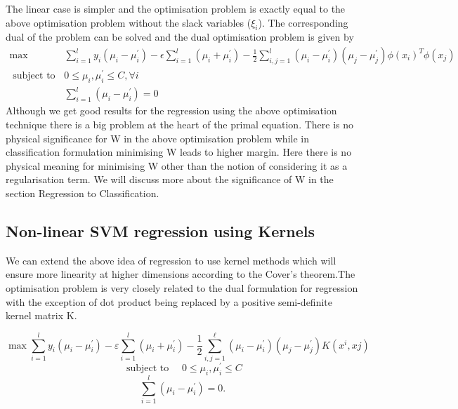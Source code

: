 \documentclass[../main.tex]{subfiles}
\begin{document}
The linear case is simpler and the optimisation problem is exactly equal to the above optimisation problem without the slack variables ($ \xi_{i}$). The corresponding dual of the problem can be solved and the dual optimisation problem is given by 
$$
\begin{aligned}
\max & \sum_{i=1}^{l} y_{i}\left(\mu_{i}-\mu_{i}^{\prime}\right)-\epsilon \sum_{i=1}^{l}\left(\mu_{i}+\mu_{i}^{\prime}\right)-\frac{1}{2} \sum_{i, j=1}^{l}\left(\mu_{i}-\mu_{i}^{\prime}\right)\left(\mu_{j}-\mu_{j}^{\prime}\right) \phi\left(x_{i}\right)^{T} \phi\left(x_{j}\right) \\
\text { subject to } \quad & 0 \leq \mu_{i}, \mu_{i}^{\prime} \leq C, \forall i \\
& \sum_{i=1}^{l}\left(\mu_{i}-\mu_{i}^{\prime}\right)=0
\end{aligned}
$$
Although we get good results for the regression using the above optimisation technique there is a big problem at the heart of the primal equation. There is no physical significance for W in the above optimisation problem while in classification formulation minimising W leads to higher margin. Here there is no physical meaning for minimising W other than the notion of considering it as a regularisation term. We will discuss more about the significance of W in the section Regression to Classification.

\subsection{Non-linear SVM regression using Kernels}
We can extend the above idea of regression to use kernel methods which will ensure more linearity at higher dimensions according to the Cover's theorem.The optimisation problem is very closely related to the dual formulation for regression with the exception of dot product being replaced by a positive semi-definite kernel matrix K.

$$
\max \sum_{i=1}^{l} y_{i}\left(\mu_{i}-\mu_{i}^{\prime}\right)-\varepsilon \sum_{i=1}^{l}\left(\mu_{i}+\mu_{i}^{\prime}\right)-\frac{1}{2} \sum_{i, j=1}^{\ell}\left(\mu_{i}-\mu_{i}^{\prime}\right)\left(\mu_{j}-\mu_{j}^{\prime}\right) K\left(x^{i}, x j\right)$$
$$\text { subject to } \quad  0 \leqslant \mu_{i}, \mu_{i}^{\prime} \leq C $$
$$\sum_{i=1}^{l}\left(\mu_{i}-\mu_{i}^{\prime}\right)=0 .
$$
\end{document}
